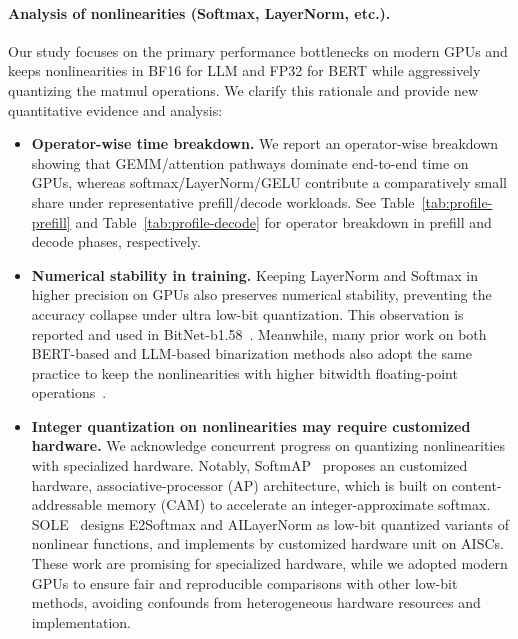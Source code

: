 \begin{revmeta}[]
\paragraph{Analysis of nonlinearities (Softmax, LayerNorm, etc.). } 
Our study focuses on the primary performance bottlenecks on modern GPUs and keeps nonlinearities in BF16 for LLM and FP32 for BERT while aggressively quantizing the matmul operations. We clarify this rationale and provide new quantitative evidence and analysis: 
\begin{itemize}
    \item \textbf{Operator-wise time breakdown.} We report an operator-wise breakdown showing that GEMM/attention pathways dominate end-to-end time on GPUs, whereas softmax/LayerNorm/GELU contribute a comparatively small share under representative prefill/decode workloads. See Table~\ref{tab:profile-prefill} and Table~\ref{tab:profile-decode} for operator breakdown in prefill and decode phases, respectively. 
    \item \textbf{Numerical stability in training. } Keeping LayerNorm and Softmax in higher precision on GPUs also preserves numerical stability, preventing the accuracy collapse under ultra low-bit quantization. This observation is reported and used in BitNet-b1.58~\cite{wang2023bitnet}. Meanwhile, many prior work on both BERT-based and LLM-based binarization methods also adopt the same practice to keep the nonlinearities with higher bitwidth floating-point operations~\cite{liu2022bit, qin2022bibert, huang2024billm, shang2023pbllm}. 
    \item \textbf{Integer quantization on nonlinearities may require customized hardware. } We acknowledge concurrent progress on quantizing nonlinearities with specialized hardware. Notably, SoftmAP~\cite{rakka2024} proposes an customized hardware, associative-processor (AP) architecture, which is built on content-addressable memory (CAM) to accelerate an integer-approximate softmax. SOLE~\cite{sole} designs E2Softmax and AILayerNorm as low-bit quantized variants of nonlinear functions, and implements by customized hardware unit on AISCs.  These work are promising for specialized hardware, while we adopted modern GPUs to ensure fair and reproducible comparisons with other low-bit methods, avoiding confounds from heterogeneous hardware resources and implementation.
\end{itemize}



\end{revmeta}
